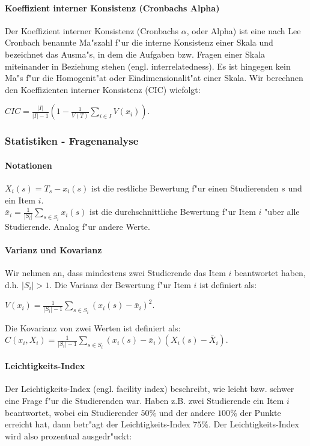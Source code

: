 \documentclass[12pt]{report}
\begin{document}
\paragraph{Koeffizient interner Konsistenz (Cronbachs Alpha)}
Der Koeffizient interner Konsistenz (Cronbachs $\alpha$, oder Alpha) ist eine nach Lee Cronbach benannte Ma"szahl f"ur die interne Konsistenz einer Skala und bezeichnet das Ausma"s, in dem die Aufgaben bzw. Fragen einer Skala miteinander in Beziehung stehen (engl. interrelatedness). Es ist hingegen kein Ma"s f"ur die Homogenit"at oder Eindimensionalit"at einer Skala. Wir berechnen den Koeffizienten interner Konsistenz (CIC) wiefolgt:

$CIC=\frac{|I|}{|I|-1}\left(1-\frac{1}{V(T)}\sum\limits_{i\in I}V(x_i)\right)$.


\subsubsection{Statistiken - Fragenanalyse}
\paragraph{Notationen}

$X_i(s) = T_s - x_i(s)$ ist die restliche Bewertung f"ur einen Studierenden $s$ und ein Item $i$.\\
$\bar{x}_i = \frac{1}{|S_i|}\sum\limits_{s\in S_i}x_i(s)$ ist die durchschnittliche Bewertung f"ur Item $i$ "uber alle Studierende. Analog f"ur andere Werte.

\paragraph{Varianz und Kovarianz}

Wir nehmen an, dass mindestens zwei Studierende das Item $i$ beantwortet haben, d.h. $|S_i| > 1$.
Die Varianz der Bewertung f"ur Item $i$ ist definiert als:

 $V(x_i) = \frac{1}{|S_i| - 1}\sum\limits_{s\in S_i} (x_i(s) - \bar{x}_i)^2$.

\noindent Die Kovarianz von zwei Werten ist definiert als:\\
$C(x_i, X_i) = \frac{1}{|S_i| - 1}\sum\limits_{s\in S_i}(x_i(s) - \bar{x}_i)(X_i(s) - \bar{X}_i)$.


\paragraph{Leichtigkeits-Index}
Der Leichtigkeits-Index (engl. facility index) beschreibt, wie leicht bzw. schwer eine Frage f"ur die Studierenden war. 
Haben z.B. zwei Studierende ein Item $i$ beantwortet, wobei ein Studierender $50\%$ und der andere $100\%$ der Punkte erreicht hat, dann betr"agt der Leichtigkeits-Index $75\%$. Der Leichtigkeits-Index wird also prozentual ausgedr"uckt:
\end{document}
